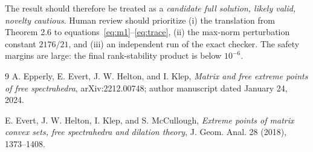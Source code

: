 \documentclass[11pt]{article}
\begin{document}
The result should therefore be treated as a \emph{candidate full solution,
likely valid, novelty cautious}.  Human review should prioritize (i) the
translation from Theorem 2.6 to equations~\eqref{eq:m1}--\eqref{eq:trace},
(ii) the max-norm perturbation constant $2176/21$, and (iii) an independent
run of the exact checker.  The safety margins are large: the final
rank-stability product is below $10^{-6}$.

\begin{thebibliography}{9}
A. Epperly, E. Evert, J. W. Helton, and I. Klep,
\emph{Matrix and free extreme points of free spectrahedra},
arXiv:2212.00748; author manuscript dated January 24, 2024.

E. Evert, J. W. Helton, I. Klep, and S. McCullough,
\emph{Extreme points of matrix convex sets, free spectrahedra and dilation
theory}, J. Geom. Anal. 28 (2018), 1373--1408.
\end{thebibliography}
\end{document}
